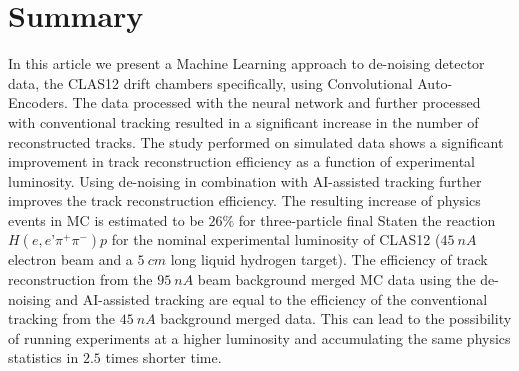 

\section{Summary}

In this article we present a Machine Learning approach to de-noising detector data, the CLAS12 drift chambers specifically, using Convolutional Auto-Encoders. The data processed with the neural network and further processed with conventional tracking resulted in a significant increase in the number of reconstructed tracks. The study performed on simulated data shows a significant improvement in track reconstruction efficiency as a function of experimental luminosity. Using de-noising in combination with AI-assisted tracking further improves the track reconstruction efficiency. 
The resulting increase of physics events in MC is estimated to be $26\%$ for three-particle final Staten the reaction 
$H(e,e’\pi^+\pi^-)p$ for the nominal experimental luminosity of CLAS12 ($45~nA$ electron beam and a $5~cm$ long 
liquid hydrogen target). The efficiency of track reconstruction from the $95~nA$ beam background merged MC data using the 
de-noising and AI-assisted tracking are equal to the efficiency of the conventional tracking from the $45~nA$ background merged data.
This can lead to the possibility of running experiments at a higher luminosity and accumulating the same physics statistics in $2.5$ times shorter time.


